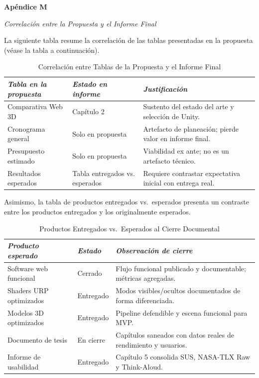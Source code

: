 \clearpage
{}
\label{apendice:M}
{\noindent\textbf{Apéndice M}\par
\noindent\textit{Correlación entre la Propuesta y el Informe Final}\par}

La siguiente tabla resume la correlación de las tablas presentadas en la propuesta (véase la tabla a continuación).

\begin{table}[htbp]
    \caption*{Correlación entre Tablas de la Propuesta y el Informe Final}
    \begin{tabularx}{\textwidth}{p{3.8cm}p{3.4cm}X}
        \hline
        \textit{Tabla en la propuesta} & \textit{Estado en informe} & \textit{Justificación} \\ \hline
        Comparativa Web 3D & Capítulo 2 & Sustento del estado del arte y selección de Unity. \\
        Cronograma general & Solo en propuesta & Artefacto de planeación; pierde valor en informe final. \\
        Presupuesto estimado & Solo en propuesta & Viabilidad ex ante; no es un artefacto técnico. \\
        Resultados esperados & Tabla entregados vs. esperados & Requiere contrastar expectativa inicial con entrega real. \\ \hline
    \end{tabularx}
\end{table}

Asimismo, la tabla de productos entregados vs.\ esperados presenta un contraste entre los productos entregados y los originalmente esperados.

\begin{table}[htbp]
    \caption*{Productos Entregados vs.\ Esperados al Cierre Documental}
    \begin{tabularx}{\textwidth}{p{3.8cm}p{2.4cm}X}
        \hline
        \textit{Producto esperado} & \textit{Estado} & \textit{Observación de cierre} \\ \hline
        Software web funcional & Cerrado & Flujo funcional publicado y documentable; métricas agregadas. \\
        Shaders URP optimizados & Entregado & Modos visibles/ocultos documentados de forma diferenciada. \\
        Modelos 3D optimizados & Entregado & Pipeline defendible y escena funcional para MVP. \\
        Documento de tesis & En cierre & Capítulos saneados con datos reales de rendimiento y usuarios. \\
        Informe de usabilidad & Entregado & Capítulo 5 consolida SUS, NASA-TLX Raw y Think-Aloud. \\ \hline
    \end{tabularx}
\end{table}

